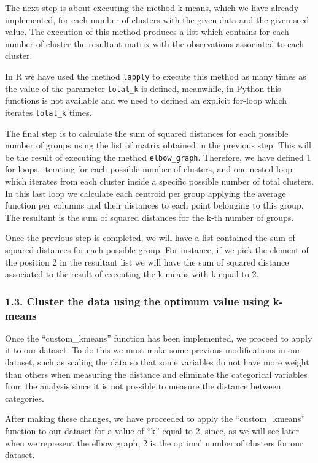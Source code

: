 \documentclass[
]{article}
\begin{document}
The next step is about executing the method k-means, which we have
already implemented, for each number of clusters with the given data and
the given seed value. The execution of this method produces a list which
contains for each number of cluster the resultant matrix with the
observations associated to each cluster.

In R we have used the method \texttt{lapply} to execute this method as
many times as the value of the parameter \texttt{total\_k} is defined,
meanwhile, in Python this functions is not available and we need to
defined an explicit for-loop which iterates \texttt{total\_k} times.

The final step is to calculate the sum of squared distances for each
possible number of groups using the list of matrix obtained in the
previous step. This will be the result of executing the method
\texttt{elbow\_graph}. Therefore, we have defined 1 for-loops, iterating
for each possible number of clusters, and one nested loop which iterates
from each cluster inside a specific possible number of total clusters.
In this last loop we calculate each centroid per group applying the
average function per columns and their distances to each point belonging
to this group. The resultant is the sum of squared distances for the
k-th number of groups.

Once the previous step is completed, we will have a list contained the
sum of squared distances for each possible group. For instance, if we
pick the element of the position 2 in the resultant list we will have
the sum of squared distance associated to the result of executing the
k-means with k equal to 2.

\hypertarget{cluster-the-data-using-the-optimum-value-using-k-means}{%
\subsubsection{1.3. Cluster the data using the optimum value using
k-means}\label{cluster-the-data-using-the-optimum-value-using-k-means}}

Once the ``custom\_kmeans'' function has been implemented, we proceed to
apply it to our dataset. To do this we must make some previous
modifications in our dataset, such as scaling the data so that some
variables do not have more weight than others when measuring the
distance and eliminate the categorical variables from the analysis since
it is not possible to measure the distance between categories.

After making these changes, we have proceeded to apply the
``custom\_kmeans'' function to our dataset for a value of ``k'' equal to
2, since, as we will see later when we represent the elbow graph, 2 is
the optimal number of clusters for our dataset.
\end{document}
